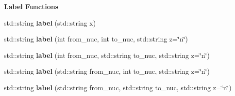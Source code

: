 \begin{Indent}{\bf Label Functions}
\begin{DoxyCompactItemize}
\item 
\hypertarget{namespacepyne_1_1rxname_a9183e4eb4d2f8386238df017a6763910}{std\+::string {\bfseries label} (std\+::string x)}\label{namespacepyne_1_1rxname_a9183e4eb4d2f8386238df017a6763910}

\item 
\hypertarget{namespacepyne_1_1rxname_a1d990996b1b80abcdf8ba7cb03bf9c0b}{std\+::string {\bfseries label} (int from\+\_\+nuc, int to\+\_\+nuc, std\+::string z=\char`\"{}n\char`\"{})}\label{namespacepyne_1_1rxname_a1d990996b1b80abcdf8ba7cb03bf9c0b}

\item 
\hypertarget{namespacepyne_1_1rxname_a2e4d7d20d4278d6b6b5b57592fab287b}{std\+::string {\bfseries label} (int from\+\_\+nuc, std\+::string to\+\_\+nuc, std\+::string z=\char`\"{}n\char`\"{})}\label{namespacepyne_1_1rxname_a2e4d7d20d4278d6b6b5b57592fab287b}

\item 
\hypertarget{namespacepyne_1_1rxname_aff83b91df8abe88197680a467b843969}{std\+::string {\bfseries label} (std\+::string from\+\_\+nuc, int to\+\_\+nuc, std\+::string z=\char`\"{}n\char`\"{})}\label{namespacepyne_1_1rxname_aff83b91df8abe88197680a467b843969}

\item 
\hypertarget{namespacepyne_1_1rxname_aa316be9d06a9987cb9816cc26926a237}{std\+::string {\bfseries label} (std\+::string from\+\_\+nuc, std\+::string to\+\_\+nuc, std\+::string z=\char`\"{}n\char`\"{})}\label{namespacepyne_1_1rxname_aa316be9d06a9987cb9816cc26926a237}

\end{DoxyCompactItemize}
\end{Indent}
